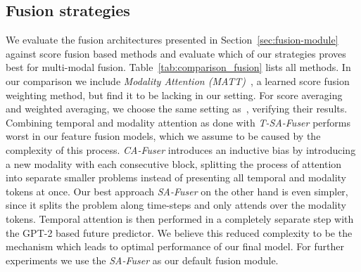 \documentclass[10pt,twocolumn,letterpaper,dvipsnames]{article}
\begin{document}
\subsection{Fusion strategies}
\label{sec:ablation-fusion}
We evaluate the fusion architectures presented in Section~\ref{sec:fusion-module} against score fusion based methods and evaluate which of our strategies proves best for multi-modal fusion. Table~\ref{tab:comparison_fusion} lists all methods. In our comparison we include \emph{Modality Attention (MATT)}~\cite{furnariWhatWouldYou2019}, a learned score fusion weighting method, but find it to be lacking in our setting. 
For score averaging and weighted averaging, we choose the same setting as~\cite{girdharAnticipativeVideoTransformer2021}, verifying their results.
Combining temporal and modality attention as done with \emph{T-SA-Fuser} performs worst in our feature fusion models, which we assume to be caused by the complexity of this process. \emph{CA-Fuser} introduces an inductive bias by introducing a new modality with each consecutive block, splitting the process of attention into separate smaller problems instead of presenting all temporal and modality tokens at once. Our best approach \emph{SA-Fuser} on the other hand is even simpler, since it splits the problem along time-steps and only attends over the modality tokens. Temporal attention is then performed in a completely separate step with the GPT-2 based future predictor. We believe this reduced complexity to be the mechanism which leads to optimal performance of our final model.
For further experiments we use the \emph{SA-Fuser} as our default fusion module.
\end{document}
